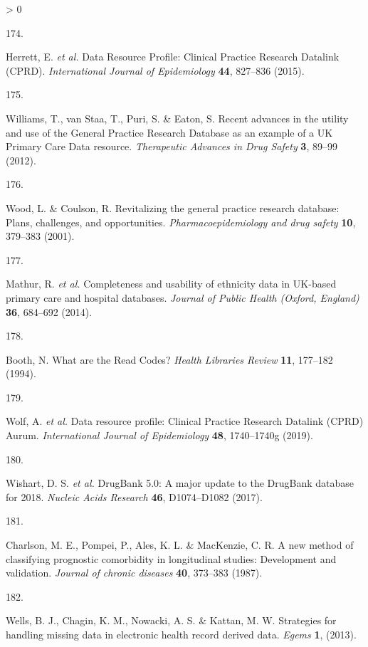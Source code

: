 \documentclass[a4paper, twoside]{templates/ociamthesis}
\newlength{\cslhangindent}
\newlength{\csllabelwidth}
\newenvironment{CSLReferences}[3] %
 {%
  \setlength{\parindent}{0pt}
  \ifodd #1 \everypar{\setlength{\hangindent}{\cslhangindent}}\ignorespaces\fi
  \ifnum #2 > 0
  \setlength{\parskip}{#2\baselineskip}
  \fi
 }%
 {}
\newcommand{\CSLLeftMargin}[1]{\parbox[t]{\maxof{\widthof{#1}}{\csllabelwidth}}{#1}}
\newcommand{\CSLRightInline}[1]{\parbox[t]{\linewidth - \csllabelwidth}{#1}}
\begin{document}
\begin{CSLReferences}{0}{0}
\leavevmode\hypertarget{ref-herrett2015}{}%
\CSLLeftMargin{174. }
\CSLRightInline{Herrett, E. \emph{et al.} Data {Resource Profile}: {Clinical Practice Research Datalink} ({CPRD}). \emph{International Journal of Epidemiology} \textbf{44}, 827--836 (2015).}

\leavevmode\hypertarget{ref-williams2012}{}%
\CSLLeftMargin{175. }
\CSLRightInline{Williams, T., van Staa, T., Puri, S. \& Eaton, S. Recent advances in the utility and use of the {General Practice Research Database} as an example of a {UK Primary Care Data} resource. \emph{Therapeutic Advances in Drug Safety} \textbf{3}, 89--99 (2012).}

\leavevmode\hypertarget{ref-wood2001revitalizing}{}%
\CSLLeftMargin{176. }
\CSLRightInline{Wood, L. \& Coulson, R. Revitalizing the general practice research database: Plans, challenges, and opportunities. \emph{Pharmacoepidemiology and drug safety} \textbf{10}, 379--383 (2001).}

\leavevmode\hypertarget{ref-mathur2014}{}%
\CSLLeftMargin{177. }
\CSLRightInline{Mathur, R. \emph{et al.} Completeness and usability of ethnicity data in {UK}-based primary care and hospital databases. \emph{Journal of Public Health (Oxford, England)} \textbf{36}, 684--692 (2014).}

\leavevmode\hypertarget{ref-booth1994}{}%
\CSLLeftMargin{178. }
\CSLRightInline{Booth, N. What are the {Read Codes}? \emph{Health Libraries Review} \textbf{11}, 177--182 (1994).}

\leavevmode\hypertarget{ref-wolf2019}{}%
\CSLLeftMargin{179. }
\CSLRightInline{Wolf, A. \emph{et al.} Data resource profile: {Clinical Practice Research Datalink} ({CPRD}) {Aurum}. \emph{International Journal of Epidemiology} \textbf{48}, 1740--1740g (2019).}

\leavevmode\hypertarget{ref-wishart2017}{}%
\CSLLeftMargin{180. }
\CSLRightInline{Wishart, D. S. \emph{et al.} {DrugBank} 5.0: A major update to the {DrugBank} database for 2018. \emph{Nucleic Acids Research} \textbf{46}, D1074--D1082 (2017).}

\leavevmode\hypertarget{ref-charlson1987new}{}%
\CSLLeftMargin{181. }
\CSLRightInline{Charlson, M. E., Pompei, P., Ales, K. L. \& MacKenzie, C. R. A new method of classifying prognostic comorbidity in longitudinal studies: Development and validation. \emph{Journal of chronic diseases} \textbf{40}, 373--383 (1987).}

\leavevmode\hypertarget{ref-wells2013strategies}{}%
\CSLLeftMargin{182. }
\CSLRightInline{Wells, B. J., Chagin, K. M., Nowacki, A. S. \& Kattan, M. W. Strategies for handling missing data in electronic health record derived data. \emph{Egems} \textbf{1}, (2013).}


\end{CSLReferences}
\end{document}
